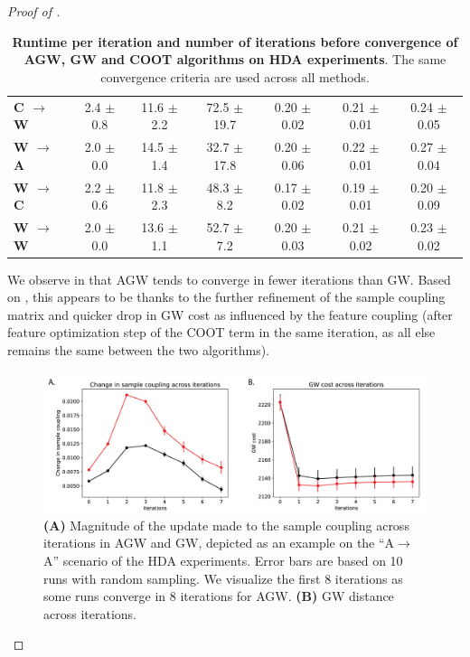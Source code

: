 \begin{proof}[Proof of ]
\begin{table}[t]
\begin{tabular}{@{}lccc|ccc@{}}
\textbf{C $\rightarrow$ W} & 2.4 $\pm$ 0.8               & 11.6 $\pm$ 2.2              & 72.5 $\pm$ 19.7         & 0.20 $\pm$ 0.02         & 0.21 $\pm$ 0.01             & 0.24 $\pm$ 0.05         \\
\textbf{W $\rightarrow$ A} & 2.0 $\pm$ 0.0              & 14.5 $\pm$ 1.4              & 32.7 $\pm$ 17.8          & 0.20 $\pm$ 0.06         & 0.22 $\pm$ 0.01             & 0.27 $\pm$ 0.04         \\
\textbf{W $\rightarrow$ C} & 2.2 $\pm$ 0.6               & 11.8 $\pm$ 2.3              & 48.3 $\pm$ 8.2           & 0.17 $\pm$ 0.02         & 0.19 $\pm$ 0.01             & 0.20 $\pm$ 0.09         \\
\textbf{W $\rightarrow$ W}  & 2.0 $\pm$ 0.0               & 13.6 $\pm$ 1.1              & 52.7 $\pm$ 7.2          & 0.20 $\pm$ 0.03        & 0.21 $\pm$ 0.02             & 0.23 $\pm$ 0.02 \\ \bottomrule
\end{tabular}
\caption{\label{tabSI:runtime}
\textbf{Runtime per iteration and number of iterations before convergence of AGW, GW and COOT
algorithms on HDA experiments}. The same convergence criteria are used across all methods.}
\end{table}

We observe in  that AGW tends to converge in fewer iterations than GW.
Based on , this appears to be thanks to the further refinement of
the sample coupling matrix and quicker drop in GW cost as influenced by the feature coupling
(after feature optimization step of the COOT term in the same iteration,
as all else remains the same between the two algorithms).
\begin{figure}[h]
    \centering
    \includegraphics[width=\linewidth]{./Chapitre5/fig/timing_plots.png}
    \caption{\label{fig:SI-timing} \textbf{(A)} Magnitude of the update made to the sample coupling
    across iterations in AGW and GW, depicted as an example on the ``A$\rightarrow$A''
    scenario of the HDA experiments. Error bars are based on 10 runs with random sampling.
    We visualize the first 8 iterations as some runs converge in 8 iterations for AGW.
    \textbf{(B)} GW distance across iterations.}
\end{figure}


\end{proof}
